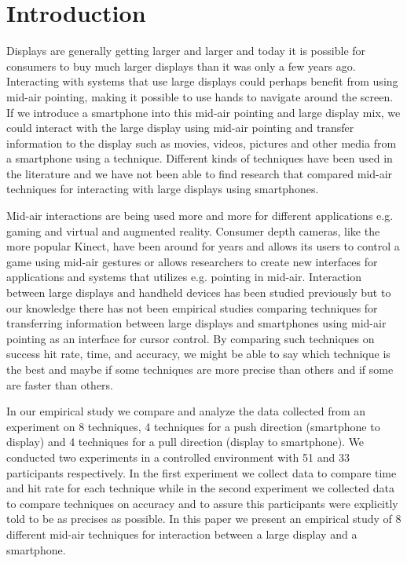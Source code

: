 \section{Introduction} \label{sec:introduction}
Displays are generally getting larger and larger and today it is possible for consumers to buy much larger displays than it was only a few years ago.
Interacting with systems that use large displays could perhaps benefit from using mid-air pointing, making it possible to use hands to navigate around the screen.
If we introduce a smartphone into this mid-air pointing and large display mix, we could interact with the large display using mid-air pointing and transfer information to the display such as movies, videos, pictures and other media from a smartphone using a technique.
Different kinds of techniques have been used in the literature and we have not been able to find research that compared mid-air techniques for interacting with large displays using smartphones.

Mid-air interactions are being used more and more for different applications e.g. gaming and virtual and augmented reality.
Consumer depth cameras, like the more popular Kinect, have been around for years and allows its users to control a game using mid-air gestures or allows researchers to create new interfaces for applications and systems that utilizes e.g. pointing in mid-air.
Interaction between large displays and handheld devices has been studied previously but to our knowledge there has not been empirical studies comparing techniques for transferring information between large displays and smartphones using mid-air pointing as an interface for cursor control.
By comparing such techniques on success hit rate, time, and accuracy, we might be able to say which technique is the best and maybe if some techniques are more precise than others and if some are faster than others.

In our empirical study we compare and analyze the data collected from an experiment on 8 techniques, 4 techniques for a push direction (smartphone to display) and 4 techniques for a pull direction (display to smartphone).
We conducted two experiments in a controlled environment with 51 and 33 participants respectively.
In the first experiment we collect data to compare time and hit rate for each technique while in the second experiment we collected data to compare techniques on accuracy and to assure this participants were explicitly told to be as precises as possible.
In this paper we present an empirical study of 8 different mid-air techniques for interaction between a large display and a smartphone.